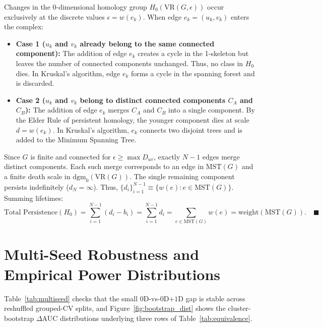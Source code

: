 \documentclass{article}
\begin{document}
Changes in the 0-dimensional homology group $H_0(\text{VR}(G, \epsilon))$ occur exclusively at the discrete values $\epsilon = w(e_k)$. When edge $e_k = (u_k, v_k)$ enters the complex:
\begin{itemize}
    \item \textbf{Case 1 ($u_k$ and $v_k$ already belong to the same connected component):} The addition of edge $e_k$ creates a cycle in the 1-skeleton but leaves the number of connected components unchanged. Thus, no class in $H_0$ dies. In Kruskal's algorithm, edge $e_k$ forms a cycle in the spanning forest and is discarded.
    \item \textbf{Case 2 ($u_k$ and $v_k$ belong to distinct connected components $C_A$ and $C_B$):} The addition of edge $e_k$ merges $C_A$ and $C_B$ into a single component. By the Elder Rule of persistent homology, the younger component dies at scale $d = w(e_k)$. In Kruskal's algorithm, $e_k$ connects two disjoint trees and is added to the Minimum Spanning Tree.
\end{itemize}
Since $G$ is finite and connected for $\epsilon \ge \max D_{uv}$, exactly $N-1$ edges merge distinct components. Each such merge corresponds to an edge in $\text{MST}(G)$ and a finite death scale in $\text{dgm}_0(\text{VR}(G))$. The single remaining component persists indefinitely ($d_N = \infty$). Thus, $\{d_i\}_{i=1}^{N-1} \equiv \{w(e) : e \in \text{MST}(G)\}$. Summing lifetimes:
\begin{equation}
    \text{Total Persistence}(H_0) = \sum_{i=1}^{N-1} (d_i - b_i) = \sum_{i=1}^{N-1} d_i = \sum_{e \in \text{MST}(G)} w(e) = \text{weight}(\text{MST}(G)). \quad \blacksquare
\end{equation}

\section{Multi-Seed Robustness and Empirical Power Distributions}
\label{app:seeds}
Table~\ref{tab:multiseed} checks that the small $0$D-vs-$0$D$+$$1$D gap is stable across reshuffled grouped-CV splits, and Figure~\ref{fig:bootstrap_dist} shows the cluster-bootstrap $\Delta$AUC distributions underlying three rows of Table~\ref{tab:equivalence}.
\end{document}
